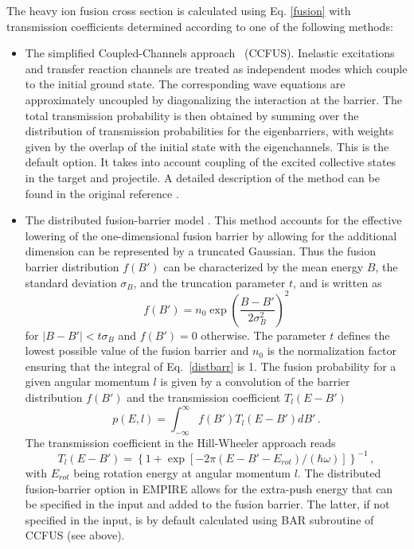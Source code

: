 \documentclass[twocolumn,amsmath,amssymb,10pt,groupedaddress,letter]{revtex4}
\begin{document}
The heavy ion fusion cross section is calculated using Eq. \ref{fusion}
with transmission coefficients determined according to one of the
following methods:

\begin{itemize}
\item The simplified Coupled-Channels approach~\cite{CCFUS} (CCFUS). Inelastic
excitations and transfer reaction channels are treated as independent
modes which couple to the initial ground state. The corresponding
wave equations are approximately uncoupled by diagonalizing the interaction
at the barrier. The total transmission probability is then obtained
by summing over the distribution of transmission probabilities for
the eigenbarriers, with weights given by the overlap of the initial
state with the eigenchannels. This is the default option. It takes into
account coupling of the excited collective states in the target and
projectile. A detailed description of the method can be found in the
original reference \cite{CCFUS}.
\item The distributed fusion-barrier
model \cite{difusb}. This method accounts for the effective lowering
of the one-dimensional fusion barrier by allowing for the additional
dimension can be represented by a truncated Gaussian. Thus the fusion
barrier distribution $f(B')$ can be characterized by the mean energy
$B$, the standard deviation $\sigma_{B}$, and the truncation parameter
$t$, and is written as
\begin{equation}
f(B')=n_{0}\exp\left(\frac{B-B'}{2\sigma_{B}^{2}}\right)^{2} \label{distbarr}
\end{equation}
\noindent for $\left|B-B'\right|<t\sigma_{B}$ and $f(B')=0$ otherwise. The
parameter $t$ defines the lowest possible value of the fusion barrier
and $n_{0}$ is the normalization factor ensuring that the integral
of Eq.~\ref{distbarr} is 1. The fusion probability for a given angular
momentum $l$ is given by a convolution of the barrier distribution
$f(B')$ and the transmission coefficient $T_{l}(E-B')$
\begin{equation}
p(E,l)=\int_{-\infty}^{\infty}f(B')T_{l}(E-B')dB'\,.
\end{equation}
\noindent The transmission coefficient in the Hill-Wheeler
approach \cite{HillWheeler} reads
\begin{equation}
T_{l}(E-B')=\left\{ 1+\exp\left[-2\pi(E-B'-E_{rot})/(\hbar\omega)\right]\right\} ^{-1}\,,
\end{equation}
\noindent with $E_{rot}$ being rotation energy at angular momentum $l$. The
distributed fusion-barrier option
in EMPIRE allows for the extra-push energy that can be specified in
the input and added to the fusion barrier. The latter, if not specified
in the input, is by default calculated using BAR subroutine of CCFUS
(see above).


\end{itemize}
\end{document}
